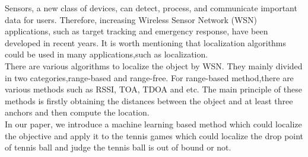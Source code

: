 
Sensors, a new class of devices, can detect, process, and communicate important data for users. Therefore, increasing Wireless Sensor Network (WSN) applications, such as target tracking and emergency response, have been developed in recent years. It is worth mentioning that localization algorithms could be used in many applications,such as localization.\\
There are various algorithms\cite{han2013localization} to localize the object by WSN. They mainly divided in two categories,range-based and range-free. For range-based method,there are various methods such as RSSI, TOA, TDOA and etc. The main principle of these methods is firstly obtaining  the distances between the object and at least three anchors and then compute the location.\\ 
In our paper, we introduce a machine learning based method which could localize the objective and apply it to the tennis games which could localize the drop point of tennis ball and judge the tennis ball is out of bound or not.